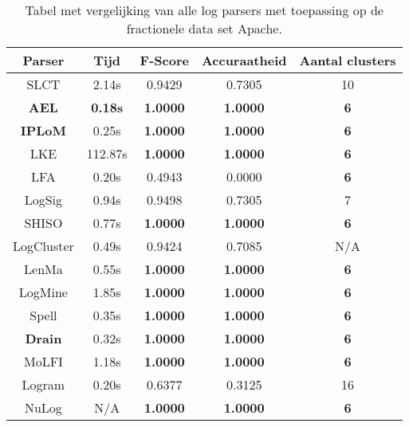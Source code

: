 \begin{table}[!hbtp]
    \caption{Tabel met vergelijking van alle log parsers met toepassing op de fractionele data set Apache.}
    \label{table:Apache}
    \begin{center}
        \begin{tabular}{||c | c | c | c | c||} 
            \hline
            Parser & Tijd & F-Score & Accuraatheid & Aantal clusters \\ [0.5ex] 
            \hline\hline
            SLCT & 2.14s & 0.9429 & 0.7305 & 10 \\
            
            \textbf{AEL} & \textbf{0.18s} & \textbf{1.0000} & \textbf{1.0000} & \textbf{6} \\ 
            
            \textbf{IPLoM} & 0.25s & \textbf{1.0000} & \textbf{1.0000} & \textbf{6}  \\
            
            LKE & 112.87s & \textbf{1.0000} & \textbf{1.0000} & \textbf{6}  \\
            
            LFA & 0.20s & 0.4943 & 0.0000 & \textbf{6}  \\
            
            LogSig & 0.94s & 0.9498 & 0.7305 & 7 \\
            
            SHISO & 0.77s & \textbf{1.0000} & \textbf{1.0000} & \textbf{6}  \\
            
            LogCluster & 0.49s & 0.9424 & 0.7085 & N/A \\
            
            LenMa & 0.55s & \textbf{1.0000} & \textbf{1.0000} & \textbf{6}  \\
            
            LogMine & 1.85s & \textbf{1.0000} & \textbf{1.0000} & \textbf{6} \\
            
            Spell & 0.35s & \textbf{1.0000} & \textbf{1.0000} & \textbf{6}  \\
            
            \textbf{Drain} & 0.32s & \textbf{1.0000} & \textbf{1.0000} & \textbf{6} \\
            
            MoLFI & 1.18s & \textbf{1.0000} & \textbf{1.0000} & \textbf{6} \\
            
            Logram & 0.20s & 0.6377 & 0.3125 & 16 \\
            
            NuLog & N/A & \textbf{1.0000} & \textbf{1.0000} & \textbf{6} \\
            \hline
        \end{tabular}
    \end{center}
\end{table}


